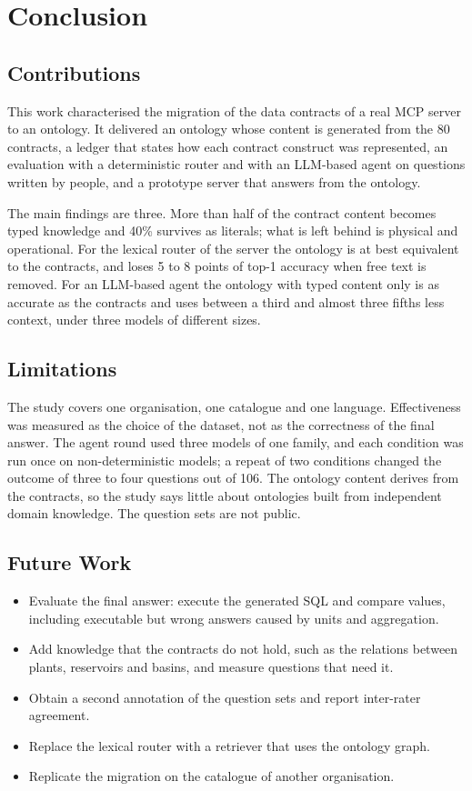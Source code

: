 \chapter{Conclusion}

\section{Contributions}
This work characterised the migration of the data contracts of a real MCP server to an
ontology. It delivered an ontology whose content is generated from the 80 contracts, a
ledger that states how each contract construct was represented, an evaluation with a
deterministic router and with an LLM-based agent on questions written by people, and a
prototype server that answers from the ontology.

The main findings are three. More than half of the contract content becomes typed knowledge
and 40\% survives as literals; what is left behind is physical and operational. For the
lexical router of the server the ontology is at best equivalent to the contracts, and loses
5 to 8 points of top-1 accuracy when free text is removed. For an LLM-based agent the
ontology with typed content only is as accurate as the contracts and uses between a third
and almost three fifths less context, under three models of different sizes.

\section{Limitations}
The study covers one organisation, one catalogue and one language. Effectiveness was
measured as the choice of the dataset, not as the correctness of the final answer. The agent
round used three models of one family, and each condition was run once on non-deterministic
models; a repeat of two conditions changed the outcome of three to four questions out of 106. The ontology content derives from
the contracts, so the study says little about ontologies built from independent domain
knowledge. The question sets are not public.

\section{Future Work}
\begin{itemize}[leftmargin=1.5cm]
\item Evaluate the final answer: execute the generated SQL and compare values, including
executable but wrong answers caused by units and aggregation.
\item Add knowledge that the contracts do not hold, such as the relations between plants,
reservoirs and basins, and measure questions that need it.
\item Obtain a second annotation of the question sets and report inter-rater agreement.
\item Replace the lexical router with a retriever that uses the ontology graph.
\item Replicate the migration on the catalogue of another organisation.
\end{itemize}

